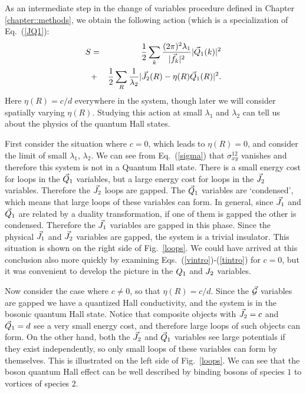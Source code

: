 As an intermediate step in the change of variables procedure defined in Chapter \ref{chapter::methods}, we obtain the following action (which is a specialization of Eq.~(\ref{JQ1}):
\begin{eqnarray}
S &=& \frac{1}{2}\sum_{k} \frac{(2\pi)^2\lambda_1}{|\vec{f}_k|^2 } |\vec{Q}_1(k)|^2\label{JQreal}\\
&+& \frac{1}{2}\sum_{R} \frac{1}{\lambda_2} |\vec{J}_2(R) - \eta(R)\vec{Q}_1(R)|^2.\nonumber
\end{eqnarray}
Here $\eta(R)=c/d$ everywhere in the system, though later we will consider spatially varying $\eta(R)$. Studying this action at small $\lambda_1$ and $\lambda_2$ can tell us about the physics of the quantum Hall states.

First consider the situation where $c=0$, which leads to $\eta(R)=0$, and consider the limit of small $\lambda_1$, $\lambda_2$. We can see from Eq.~(\ref{sigma}) that $\sigma^{12}_{xy}$ vanishes and therefore this system is not in a Quantum Hall state. 
There is a small energy cost for loops in the $\vec{Q}_1$ variables, but a large energy cost for loops in the $\vec{J}_2$ variables. Therefore the $\vec{J}_2$ loops are gapped. The $\vec{Q}_1$ variables are `condensed', which means that large loops of these variables can form. In general, since $\vec{J}_1$ and $\vec{Q}_1$ are related by a duality transformation, if one of them is gapped the other is condensed. Therefore the $\vec{J}_1$ variables are gapped in this phase. Since the physical $\vec{J}_1$ and $\vec{J}_2$ variables are gapped, the system is a trivial insulator. This situation is shown on the right side of Fig.~\ref{loops}.  We could have arrived at this conclusion also more quickly by examining Eqs.~(\ref{vintro})-(\ref{tintro}) for $c=0$, but it was convenient to develop the picture in the $Q_1$ and $J_2$ variables.

Now consider the case where $c\neq0$, so that $\eta(R)=c/d$. Since the $\vec{\mathcal{G}}$ variables are gapped we have a quantized Hall conductivity, and the system is in the bosonic quantum Hall state.
Notice that composite objects with $\vec{J}_2=c$ and $\vec{Q}_1=d$ see a very small energy cost, and therefore large loops of such objects can form.  On the other hand, both the $\vec{J}_2$ and $\vec{Q}_1$ variables see large potentials if they exist independently, so only small loops of these variables can form by themselves. This is illustrated on the left side of Fig.~\ref{loops}. We can see that the boson quantum Hall effect can be well described by binding bosons of species $1$ to vortices of species $2$. 

